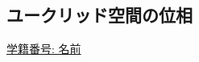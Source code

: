 \documentclass[dvipdfmx,a4paper,11pt]{article}
\theoremstyle{definition}
\begin{document}

 
 \newpage
 
 \begin{center}
\section{ユークリッド空間の位相}
\label{sec-10}
\end{center}

   \begin{flushleft}
{ \large \underline{学籍番号: \hspace{4cm} 名前  \hspace{8.5cm}}}
{\footnotesize }
\end{flushleft}
\end{document}
